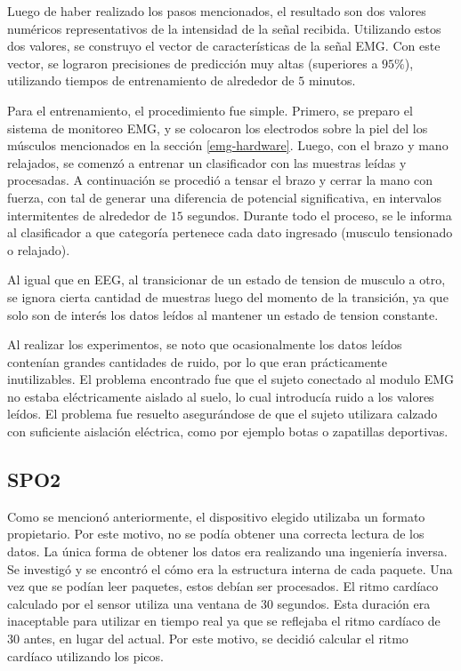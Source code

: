 Luego de haber realizado los pasos mencionados, el resultado son dos valores numéricos representativos de la intensidad de la señal recibida.  Utilizando estos dos valores, se construyo el vector de características de la señal EMG. Con este vector, se lograron precisiones de predicción muy altas (superiores a $ 95 \%$), utilizando tiempos de entrenamiento de alrededor de $5$ minutos.

Para el entrenamiento, el procedimiento fue simple. Primero, se preparo el sistema de monitoreo EMG, y se colocaron los electrodos sobre la piel del los músculos mencionados en la sección \ref{emg-hardware}. Luego, con el brazo y mano relajados, se comenzó a entrenar un clasificador con las muestras leídas y procesadas. A continuación se procedió a tensar el brazo y cerrar la mano con fuerza, con tal de generar una diferencia de potencial significativa, en intervalos intermitentes de alrededor de $15$ segundos. Durante todo el proceso, se le informa al clasificador a que categoría pertenece cada dato ingresado (musculo tensionado o relajado).

Al igual que en EEG, al transicionar de un estado de tension de musculo a otro, se ignora cierta cantidad de muestras luego del momento de la transición, ya que solo son de interés los datos leídos al mantener un estado de tension constante. 

Al realizar los experimentos, se noto que ocasionalmente los datos leídos contenían grandes cantidades de ruido, por lo que eran prácticamente inutilizables. El problema encontrado fue que el sujeto conectado al modulo EMG no estaba eléctricamente aislado al suelo, lo cual introducía ruido a los valores leídos. El problema fue resuelto asegurándose de que el sujeto utilizara calzado con suficiente aislación eléctrica, como por ejemplo botas o zapatillas deportivas.

\subsection{SPO2}

Como se mencionó anteriormente, el dispositivo elegido utilizaba un formato propietario. Por este motivo, no se podía obtener una correcta lectura de los datos. La única forma de obtener los datos era realizando una ingeniería inversa. Se investigó y se encontró el cómo era la estructura interna de cada paquete. Una vez que se podían leer paquetes, estos debían ser procesados. El ritmo cardíaco calculado por el sensor utiliza una ventana de 30 segundos. Esta duración era inaceptable para utilizar en tiempo real ya que se reflejaba el ritmo cardíaco de 30 antes, en lugar del actual. Por este motivo, se decidió calcular el ritmo cardíaco utilizando los picos.


